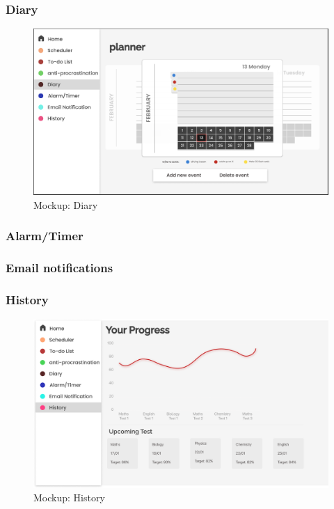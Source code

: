 \documentclass[a4paper]{article}
\begin{document}
{\subsubsection{Diary}

\begin{figure}[H] %
	\centering %
	\includegraphics[width=1\textwidth]{./images/Mockup_Diary.jpg} %
	\caption*{Mockup: Diary} %
	\label{Fig.Diary} %
\end{figure}

\subsubsection{Alarm/Timer}

\subsubsection{Email notifications}

\subsubsection{History}

\begin{figure}[H] %
	\centering %
	\includegraphics[width=1\textwidth]{./images/Mockup_History.png} %
	\caption*{Mockup: History} %
	\label{Fig.History} %
\end{figure}


}
\end{document}
